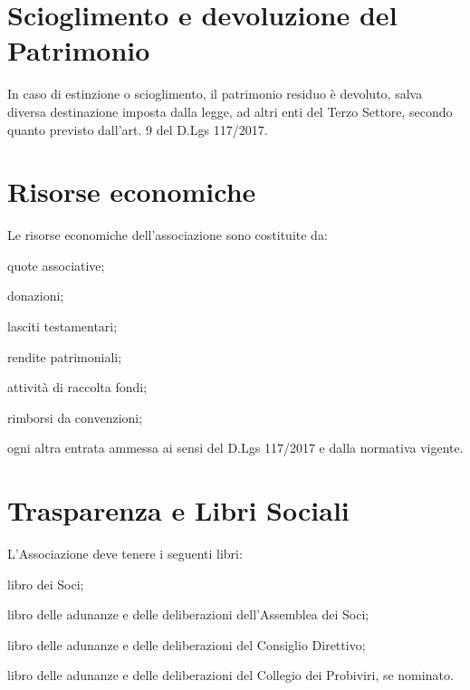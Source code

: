 \documentclass[legalpaper, 11pt]{exam}
\let\tempone\enumerate
\let\temptwo\endenumerate
\renewenvironment{enumerate}{\tempone\addtolength{\itemsep}{-0.45\baselineskip}}{\temptwo}
\begin{document}
{\section{Scioglimento e devoluzione del Patrimonio}
\begin{enumerate}
 \item In caso di estinzione o scioglimento, il patrimonio residuo è devoluto, salva diversa destinazione imposta dalla legge, ad altri enti del Terzo Settore, secondo quanto previsto dall’art. 9 del D.Lgs 117/2017.
\end{enumerate}

\section{Risorse economiche}
\begin{enumerate}
 \item Le risorse economiche dell'associazione sono costituite da:
 \vspace{-5pt}
 \begin{enumerate}
  \item quote associative;
  \item donazioni;
  \item lasciti testamentari;
  \item rendite patrimoniali;
  \item attività di raccolta fondi;
  \item rimborsi da convenzioni;
  \item ogni altra entrata ammessa ai sensi del D.Lgs 117/2017 e dalla normativa vigente.
 \end{enumerate}
\end{enumerate}


\section{Trasparenza e Libri Sociali}
\begin{enumerate}
 \item L'Associazione deve tenere i seguenti libri: 
 \vspace{-5pt}
 \begin{enumerate}
  \item libro dei Soci;
  \item libro delle adunanze e delle deliberazioni dell'Assemblea dei Soci;
  \item libro delle adunanze e delle deliberazioni del Consiglio Direttivo;
  \item libro delle adunanze e delle deliberazioni del Collegio dei Probiviri, se nominato.
 \end{enumerate}
 

\end{enumerate}}
\end{document}
